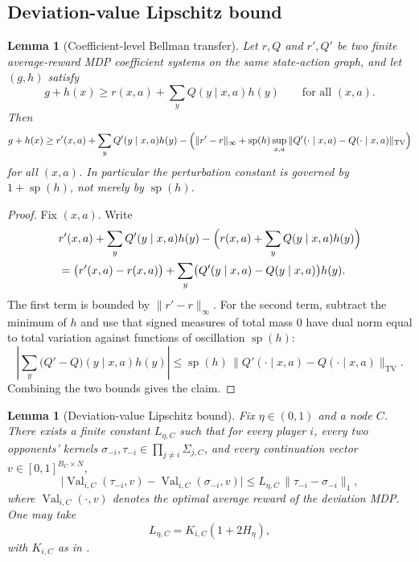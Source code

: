 \documentclass[12pt]{article}
\newtheorem{lemma}[theorem]{Lemma}
\theoremstyle{definition}
\newcommand{\1}{\mathbf{1}}
\DeclareMathOperator{\spn}{sp}
\begin{document}
\subsection{Deviation-value Lipschitz bound}

\begin{lemma}[Coefficient-level Bellman transfer]
\label{lem:coefficient-transfer}
Let $r,Q$ and $r',Q'$ be two finite average-reward MDP coefficient systems on the
same state-action graph, and let $(g,h)$ satisfy
\[
g+h(x)\ge r(x,a)+\sum_y Q(y\mid x,a)h(y)
\qquad\text{for all }(x,a).
\]
Then
\[
g+h(x)
\ge
r'(x,a)+\sum_y Q'(y\mid x,a)h(y)
-\Bigl(\|r'-r\|_\infty + \spn(h)\sup_{x,a}\|Q'(\cdot\mid x,a)-Q(\cdot\mid x,a)\|_{\mathrm{TV}}\Bigr)
\]
for all $(x,a)$. In particular the perturbation constant is governed by
$1+\spn(h)$, not merely by $\spn(h)$.
\end{lemma}

\begin{proof}
Fix $(x,a)$. Write
\begin{align*}
&r'(x,a)+\sum_y Q'(y\mid x,a)h(y)
-
\Bigl(r(x,a)+\sum_y Q(y\mid x,a)h(y)\Bigr)
\\
&= \bigl(r'(x,a)-r(x,a)\bigr)
+
\sum_y\bigl(Q'(y\mid x,a)-Q(y\mid x,a)\bigr)h(y).
\end{align*}
The first term is bounded by $\|r'-r\|_\infty$. For the second term, subtract the
minimum of $h$ and use that signed measures of total mass $0$ have dual norm equal
to total variation against functions of oscillation $\spn(h)$:
\[
\left|\sum_y\bigl(Q'-Q\bigr)(y\mid x,a)h(y)\right|
\le
\spn(h)\,\|Q'(\cdot\mid x,a)-Q(\cdot\mid x,a)\|_{\mathrm{TV}}.
\]
Combining the two bounds gives the claim.
\end{proof}

\begin{lemma}[Deviation-value Lipschitz bound]
\label{lem:deviation-lipschitz}
Fix $\eta\in(0,1)$ and a node $C$. There exists a finite constant $L_{\eta,C}$
such that for every player $i$, every two opponents' kernels
$\sigma_{-i},\tau_{-i}\in\prod_{j\ne i}\Sigma_{j,C}$, and every continuation vector
$v\in[0,1]^{B_C\times N}$,
\[
\bigl|\operatorname{Val}_{i,C}(\tau_{-i},v)-\operatorname{Val}_{i,C}(\sigma_{-i},v)\bigr|
\le L_{\eta,C}\,\|\tau_{-i}-\sigma_{-i}\|_1,
\]
where $\operatorname{Val}_{i,C}(\cdot,v)$ denotes the optimal average reward of the
deviation MDP. One may take
\[
L_{\eta,C}=K_{i,C}(1+2H_\eta),
\]
with $K_{i,C}$ as in .
\end{lemma}
\end{document}
